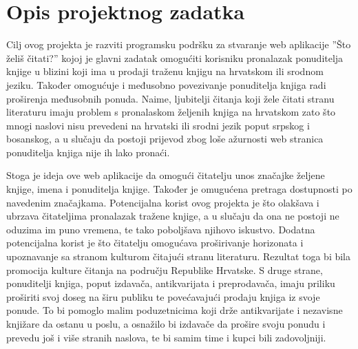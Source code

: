 \chapter{Opis projektnog zadatka}
		
		
		 Cilj ovog projekta je razviti programsku podršku za stvaranje web aplikacije  ”Što želiš čitati?” kojoj je glavni zadatak omogućiti korisniku pronalazak ponuditelja knjige u blizini koji ima u prodaji traženu knjigu na hrvatskom ili srodnom jeziku. Također omogućuje i međusobno povezivanje ponuditelja knjiga radi proširenja međusobnih ponuda. Naime, ljubitelji čitanja koji žele čitati stranu literaturu imaju problem s pronalaskom željenih knjiga na hrvatskom zato što mnogi naslovi nisu prevedeni na hrvatski ili srodni jezik poput srpskog i bosanskog, a u slučaju da postoji prijevod zbog loše ažurnosti web stranica ponuditelja knjiga nije ih lako pronaći.  

        Stoga je ideja ove web aplikacije da omogući čitatelju unos značajke željene knjige, imena i ponuditelja knjige. Također je omugućena pretraga dostupnosti po navedenim značajkama.  Potencijalna korist ovog projekta je što olakšava i ubrzava čitateljima pronalazak tražene knjige, a u slučaju da ona ne postoji ne oduzima im puno vremena, te tako poboljšava njihovo iskustvo.  Dodatna potencijalna korist je što čitatelju omogućava proširivanje horizonata i upoznavanje sa stranom kulturom čitajući stranu literaturu. Rezultat toga bi bila promocija kulture čitanja na području Republike Hrvatske. S druge strane, ponuditelji knjiga, poput izdavača, antikvarijata i preprodavača, imaju priliku proširiti svoj doseg na širu publiku te povećavajući prodaju knjiga iz svoje ponude. To bi pomoglo malim poduzetnicima koji drže antikvarijate i nezavisne knjižare da ostanu u poslu, a osnažilo bi izdavače  da prošire svoju ponudu i prevedu još i više stranih naslova, te bi samim time i kupci bili zadovoljniji. \\ 

